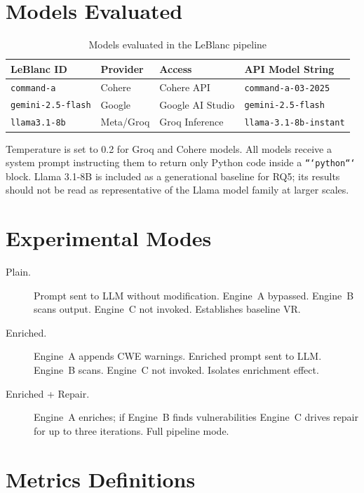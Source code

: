\documentclass[12pt,a4paper]{report}
\begin{document}
\section{Models Evaluated}
\label{sec:models}

\begin{table}[H]
\centering
\caption{Models evaluated in the LeBlanc pipeline}
\label{tab:models}
\renewcommand{\arraystretch}{1.3}
\begin{tabularx}{\textwidth}{@{}lllX@{}}
\toprule
\textbf{LeBlanc ID}      & \textbf{Provider} & \textbf{Access}
                         & \textbf{API Model String} \\
\midrule
\texttt{command-a}       & Cohere   & Cohere API        & \texttt{command-a-03-2025} \\
\texttt{gemini-2.5-flash}& Google   & Google AI Studio  & \texttt{gemini-2.5-flash} \\
\texttt{llama3.1-8b}     & Meta/Groq& Groq Inference    & \texttt{llama-3.1-8b-instant} \\
\bottomrule
\end{tabularx}
\end{table}

Temperature is set to 0.2 for Groq and Cohere models. All models receive a system
prompt instructing them to return only Python code inside a \texttt{```python```}
block. Llama 3.1-8B is included as a generational baseline for RQ5; its results
should not be read as representative of the Llama model family at larger scales.

\section{Experimental Modes}
\label{sec:modes}

\begin{description}
  \item[Plain.] Prompt sent to LLM without modification. Engine~A bypassed.
        Engine~B scans output. Engine~C not invoked. Establishes baseline VR.
  \item[Enriched.] Engine~A appends CWE warnings. Enriched prompt sent to LLM.
        Engine~B scans. Engine~C not invoked. Isolates enrichment effect.
  \item[Enriched + Repair.] Engine~A enriches; if Engine~B finds vulnerabilities
        Engine~C drives repair for up to three iterations. Full pipeline mode.
\end{description}

\section{Metrics Definitions}
\label{sec:metrics}
\end{document}
